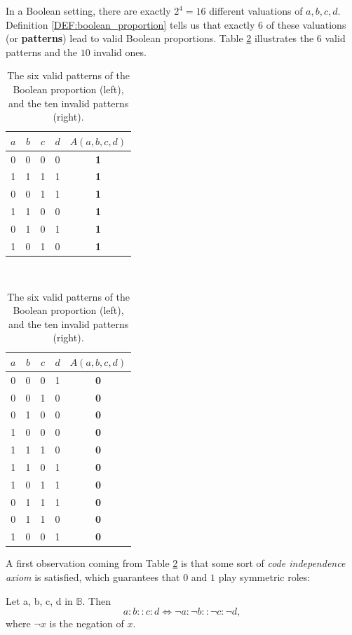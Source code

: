 In a Boolean setting, there are exactly $2^4 = 16$ different valuations of $a,
b, c, d$. Definition \ref{DEF:boolean_proportion} tells us that exactly $6$ of
these valuations (or \textbf{patterns}) lead to valid Boolean proportions. Table
\ref{TAB:six_valid_patterns} illustrates the $6$ valid patterns and the $10$
invalid ones.
\begin{table}[t]
  \centering
  \begin{tabular}[t]{ccccc}
    \toprule
    $a$ & $b$ & $c$ & $d$ &  $A(a, b, c, d)$\\
    \midrule
    0 & 0 & 0 & 0 &   \textbf{1}\\
    1 & 1 & 1 & 1 &   \textbf{1}\\
    0 & 0 & 1 & 1 &   \textbf{1}\\
    1 & 1 & 0 & 0 &   \textbf{1}\\
    0 & 1 & 0 & 1 &   \textbf{1}\\
    1 & 0 & 1 & 0 &   \textbf{1}\\
    \bottomrule
  \end{tabular}
  ~~~~
  \begin{tabular}[t]{ccccc}
    \toprule
    $a$ & $b$ & $c$ & $d$ &  $A(a, b, c, d)$\\
    \midrule
    0 & 0 & 0 & 1 &   \textbf{0}\\
    0 & 0 & 1 & 0 &   \textbf{0}\\
    0 & 1 & 0 & 0 &   \textbf{0}\\
    1 & 0 & 0 & 0 &   \textbf{0}\\
    1 & 1 & 1 & 0 &   \textbf{0}\\
    1 & 1 & 0 & 1 &   \textbf{0}\\
    1 & 0 & 1 & 1 &   \textbf{0}\\
    0 & 1 & 1 & 1 &   \textbf{0}\\
    0 & 1 & 1 & 0 &   \textbf{0}\\
    1 & 0 & 0 & 1 &   \textbf{0}\\
    \bottomrule
  \end{tabular}
  \caption{The six valid patterns of the Boolean proportion (left), and the ten
  invalid patterns (right).}
  \label{TAB:six_valid_patterns}
\end{table}
A first observation coming from Table \ref{TAB:six_valid_patterns} is that some
sort of {\it code independence axiom} is satisfied, which guarantees that $0$
and $1$ play symmetric roles:
\begin{property}
  Let a, b, c, d in $\mathbb{B}$. Then
  $$a : b :: c : d \iff \neg a :  \neg b ::  \neg c :  \neg d,$$
  where $\neg x$ is the negation of $x$.
\end{property}

